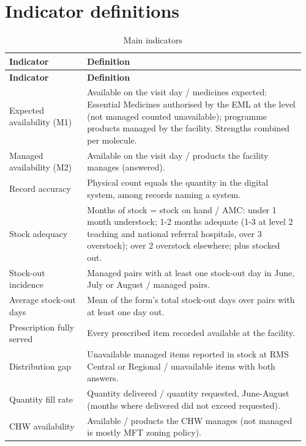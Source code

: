 \documentclass[10pt,a4paper]{report}
\begin{document}
\section{Indicator definitions}
{\footnotesize\setlength{\tabcolsep}{3pt}\renewcommand{\arraystretch}{1.15}
\begin{longtable}{>{\raggedright\arraybackslash}p{0.252\linewidth}>{\raggedright\arraybackslash}p{0.708\linewidth}}
\caption{Main indicators}\\
\rowcolor{navy}\textbf{\color{white}Indicator} & \textbf{\color{white}Definition} \\
\endfirsthead
\rowcolor{navy}\textbf{\color{white}Indicator} & \textbf{\color{white}Definition} \\
\endhead
Expected availability (M1) & Available on the visit day / medicines expected: Essential Medicines authorised by the EML at the level (not managed counted unavailable); programme products managed by the facility. Strengths combined per molecule. \\
\rowcolor{band}Managed availability (M2) & Available on the visit day / products the facility manages (answered). \\
Record accuracy & Physical count equals the quantity in the digital system, among records naming a system. \\
\rowcolor{band}Stock adequacy & Months of stock = stock on hand / AMC: under 1 month understock; 1-2 months adequate (1-3 at level 2 teaching and national referral hospitals, over 3 overstock); over 2 overstock elsewhere; plus stocked out. \\
Stock-out incidence & Managed pairs with at least one stock-out day in June, July or August / managed pairs. \\
\rowcolor{band}Average stock-out days & Mean of the form's total stock-out days over pairs with at least one day out. \\
Prescription fully served & Every prescribed item recorded available at the facility. \\
\rowcolor{band}Distribution gap & Unavailable managed items reported in stock at RMS Central or Regional / unavailable items with both answers. \\
Quantity fill rate & Quantity delivered / quantity requested, June-August (months where delivered did not exceed requested). \\
\rowcolor{band}CHW availability & Available / products the CHW manages (not managed is mostly MFT zoning policy). \\
\end{longtable}}
\end{document}
